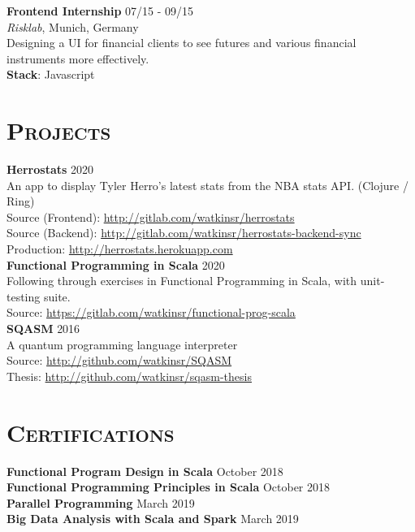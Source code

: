 \documentclass[line, margin, 10pt]{res}
\begin{document}
\begin{resume}
{\bf Frontend Internship} {\hfill  07/15 - 09/15}\\
{\it Risklab}, Munich, Germany\\
Designing a UI for financial clients to see futures and various financial instruments more effectively.\\
{\bf Stack}: Javascript


\section{\textsc{Projects}}

{\bf Herrostats} {\hfill 2020}\\
An app to display Tyler Herro's latest stats from the NBA stats API. (Clojure / Ring) \\
Source (Frontend): \url{http://gitlab.com/watkinsr/herrostats}\\
Source (Backend): \url{http://gitlab.com/watkinsr/herrostats-backend-sync}\\
Production: \url{http://herrostats.herokuapp.com}\\

{\bf Functional Programming in Scala} {\hfill 2020}\\
Following through exercises in Functional Programming in Scala, with unit-testing suite.\\
Source: \url{https://gitlab.com/watkinsr/functional-prog-scala}\\

{\bf SQASM} {\hfill 2016}\\
A quantum programming language interpreter\\
Source: \url{http://github.com/watkinsr/SQASM}\\
Thesis: \url{http://github.com/watkinsr/sqasm-thesis}\\


\newpage

\section{\textsc{Certifications}}
{\bf Functional Program Design in Scala} {\hfill October 2018}\\
{\bf Functional Programming Principles in Scala} {\hfill October 2018}\\
{\bf Parallel Programming} {\hfill March 2019}\\
{\bf Big Data Analysis with Scala and Spark} {\hfill March 2019}\\



\end{resume}
\end{document}
